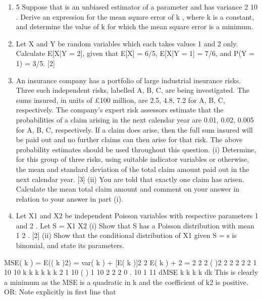 \documentclass[a4paper,12pt]{article}
\begin{document}
\begin{enumerate}
\item
5 Suppose that is an unbiased estimator of a parameter and has variance
2
10
.
Derive an expression for the mean square error of k , where k is a constant, and
determine the value of k for which the mean square error is a minimum.
\item Let X and Y be random variables which each takes values 1 and 2 only.
Calculate E[X|Y = 2], given that E[X] = 6/5, E[X|Y = 1] = 7/6, and P(Y = 1) = 3/5.
[2]
\item An insurance company has a portfolio of large industrial insurance risks. Three such
independent risks, labelled A, B, C, are being investigated. The sums insured, in units
of £100 million, are 2.5, 4.8, 7.2 for A, B, C, respectively. The company's expert risk
assessors estimate that the probabilities of a claim arising in the next calendar year are
0.01, 0.02, 0.005 for A, B, C, respectively. If a claim does arise, then the full sum
insured will be paid out and no further claims can then arise for that risk. The above
probability estimates should be used throughout this question.
(i) Determine, for this group of three risks, using suitable indicator variables or
otherwise, the mean and standard deviation of the total claim amount paid out
in the next calendar year.
[3]
(ii) You are told that exactly one claim has arisen. Calculate the mean total claim
amount and comment on your answer in relation to your answer in part (i).
\item Let X1 and X2 be independent Poisson variables with respective parameters 1
and 2 .
Let S = X1 X2
(i) Show that S has a Poisson distribution with mean 1 2 . [2]
(ii) Show that the conditional distribution of X1 given S = s is binomial, and state
its parameters.
\end{enumerate}
 MSE( k ) = E(( k )2) = var( k ) + [E( k )]2 2 E( k ) + 2
=
2 2
2 ( )2 2 2 2 2 2 1
10 10
k
k k k k k
2
1
10
( ) 1 10
2 2 2 0 .
10 1 11
dMSE k k
k k
dk
This is clearly a minimum as the MSE is a quadratic in k and the coefficient of k2 is
positive.
OR: Note explicitly in first line that
\end{document}
